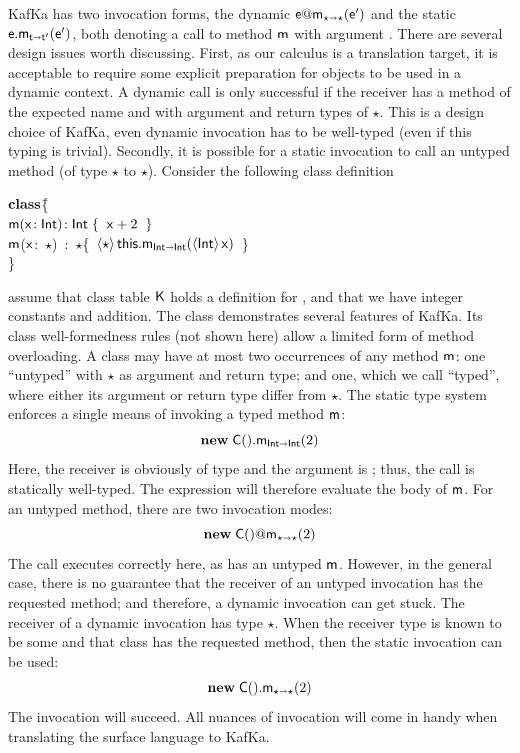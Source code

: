 \documentclass[a4paper,UKenglish]{lipics-v2018}
\makeatletter
\newcommand{\HS}{\hspace{.2cm}}
\newcommand{\EM}[1]{\ensuremath{#1}\xspace}
\newcommand{\xt}[1]{{\sf{#1}}}
\newcommand{\bt}[1]{\xt{\bf #1}}
\newcommand{\EMxt}[1]{\EM{\xt{#1}}}
\newcommand{\x}{\EMxt x}
\newcommand{\m}{\EMxt m}
\newcommand{\K}{\EMxt K}
\newcommand{\any}{\EM{\star}}
\newcommand{\this}{\EMxt{this}}
\newcommand{\KCall}[5]{\EM{{#1}.{#2}_{{#4} \shortrightarrow {#5}}(#3)}}
\newcommand{\DynCall}[3]{\EM{#1@#2_{\any\shortrightarrow\any}(#3)}}
\newcommand{\New}[2]{\EM{\new\;#1(#2)}}
\newcommand{\SubCast}[2]{\EM{\langle{#1}\rangle\,{#2}}}
\newcommand{\new}{\EM{\bt{new}}}
\newcommand{\HT}[2]{\EM{{#1}\!:{#2}}}
\newcommand{\Mdef}[5]{\EM{ \HT{ #1( \HT{#2}{#3})}{#4}\;\{{#5}\}}}
\newcommand{\class}{\EM{\bf{class}}}
\newcommand{\kafka}{{\sf KafKa}\xspace}
\newcounter{rules}
\newcounter{conds}
\newcounter{cond}[conds]
\newcommand{\Int}{\xt{Int}}
\makeatother
\begin{document}
\kafka has two invocation forms, the dynamic \DynCall\e\m\ep and the static
\KCall\e\m\ep\t\tp, both denoting a call to method \m with argument \ep.
There are several design issues worth discussing. First, as our calculus is
a translation target, it is acceptable to require some explicit preparation
for objects to be used in a dynamic context. A dynamic call is only
successful if the receiver has a method of the expected name and with
argument and return types of \any. This is a design choice of \kafka, even
dynamic invocation has to be well-typed (even if this typing is
trivial). Secondly, it is possible for a static invocation to call an untyped
method (of type \any to \any).
Consider the following
class definition

\begin{tabbing}
\small\hspace{1.5em}\class \C \=\{\\
\>\HS\HS\Mdef\m\x\Int\Int{\HS\x+2\HS}\\
\>\HS\HS\=\m(\x:~\any)~:~\any\{~\SubCast\any{\KCall\this\m{\SubCast\Int\x}\Int\Int}~\}\\
\> \}
\end{tabbing}
assume that class table \K holds a definition for \Int, and that we have
integer constants and addition.
The class demonstrates several features of \kafka. Its class
well-formedness rules (not shown here) allow a limited form of method
overloading. A class may have at most two occurrences of any method \m: one 
``untyped'' with \any as argument and return type; and one,
which we call ``typed'', where either its argument or return type differ from \any.
The static type system enforces a single means of invoking a typed method
\m:
\[\KCall{\New\C{}}\m{2}\Int\Int\] 
Here, the receiver is obviously of type \C and the argument is \Int; thus, the
call is statically well-typed. The expression will therefore 
evaluate the body of \m. For an untyped method, there are two invocation
modes:
\[\DynCall{\New\C{}}\m{2}\]
The call executes correctly here, as \C has an untyped \m. However,
in the general case, there is no guarantee that the receiver of an untyped
invocation has the requested method; and therefore, a dynamic invocation can
get stuck. The receiver of a dynamic invocation has type \any. When the
receiver type is known to be some \C and that class has the requested method,
then the static invocation can be used:
\[\KCall{\New\C{}}\m{2}\any\any\]
The invocation will succeed. All nuances of invocation
will come in handy when translating the surface language to \kafka.
\end{document}
